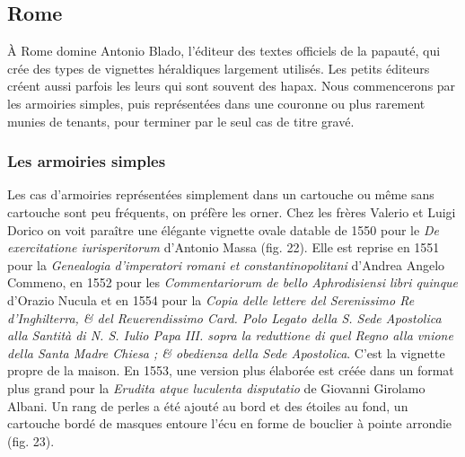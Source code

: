 \documentclass[12pt,twoside,openany]{book}
\begin{document}
\subsection{Rome}

À Rome domine Antonio Blado, l’éditeur des textes officiels de la papauté, qui crée des types de vignettes héraldiques largement utilisés. Les petits éditeurs créent aussi parfois les leurs qui sont souvent des hapax. Nous commencerons par les armoiries simples, puis représentées dans une couronne ou plus rarement munies de tenants, pour terminer par le seul cas de titre gravé.

\subsubsection{Les armoiries simples}

Les cas d’armoiries représentées simplement dans un cartouche ou même sans cartouche sont peu fréquents, on préfère les orner. Chez les frères Valerio et Luigi Dorico on voit paraître une élégante vignette ovale datable de 1550 pour le \textit{De exercitatione iurisperitorum} d’Antonio Massa (fig. 22). Elle est reprise en 1551 pour la \textit{Genealogia d’imperatori romani et constantinopolitani} d’Andrea Angelo Commeno, en 1552 pour les \textit{Commentariorum de bello Aphrodisiensi libri quinque} d’Orazio Nucula et en 1554 pour la \textit{Copia delle lettere del Serenissimo Re d’Inghilterra, \& del Reuerendissimo Card. Polo Legato della S. Sede Apostolica alla Santità di N. S. Iulio Papa III. sopra la reduttione di quel Regno alla vnione della Santa Madre Chiesa ; \& obedienza della Sede Apostolica}. C’est la vignette propre de la maison. En 1553, une version plus élaborée est créée dans un format plus grand pour la \textit{Erudita atque luculenta disputatio} de Giovanni Girolamo Albani. Un rang de perles a été ajouté au bord et des étoiles au fond, un cartouche bordé de masques entoure l’écu en forme de bouclier à pointe arrondie (fig. 23).
\end{document}
